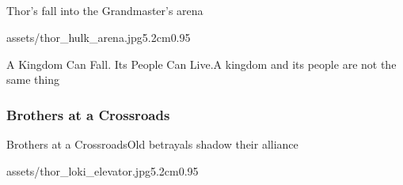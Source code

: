 \subsection{\sakaartitle}
\begin{frame}{\sakaartitle}{Thor's fall into the Grandmaster's arena}
    \begin{SlideTitlePhoto}{assets/thor_hulk_arena.jpg}{5.2cm}{0.95\linewidth}
        \caption{Thor faces the Hulk in Sakaar's arena.}
    \end{SlideTitlePhoto}
\end{frame}

\begin{frame}{A Kingdom Can Fall. Its People Can Live.}{A kingdom and its people are not the same thing}
    \begin{SlidePhotoPair}
        \hfill
        \caption{On Sakaar, the brothers find a way back to the people under Hela's rule.}
    \end{SlidePhotoPair}
\end{frame}

\subsubsection{Brothers at a Crossroads}
\begin{frame}{Brothers at a Crossroads}{Old betrayals shadow their alliance}
    \begin{SlideTitlePhoto}{assets/thor_loki_elevator.jpg}{5.2cm}{0.95\linewidth}
        \caption{Thor knows Loki may still choose his own escape.}
    \end{SlideTitlePhoto}
\end{frame}

